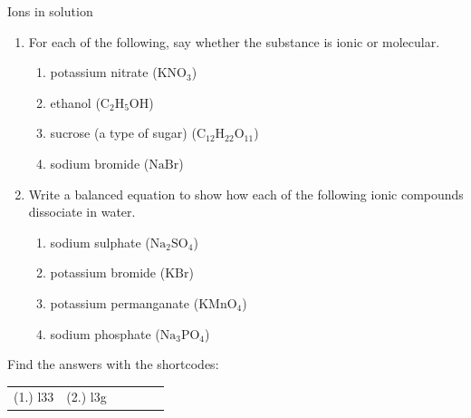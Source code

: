     \noindent
  \label{m38720*secfhsst!!!underscore!!!id338}
            \begin{exercises}{Ions in solution         }
            \nopagebreak
            \label{m38720*id336094}\begin{enumerate}[noitemsep, label=\textbf{\arabic*}. ] 
            \label{m38720*uid22}\item For each of the following, say whether the substance is ionic or molecular.
\label{m38720*id336110}\begin{enumerate}[noitemsep, label=\textbf{\alph*}. ] 
            \label{m38720*uid23}\item potassium nitrate ($\mathrm{KNO}{}_{3}$)
\label{m38720*uid24}\item ethanol ($\mathrm{C}{}_{2}\mathrm{H}{}_{5}\mathrm{OH}$)
\label{m38720*uid25}\item sucrose (a type of sugar) ($\mathrm{C}{}_{12}\mathrm{H}{}_{22}\mathrm{O}{}_{11}$)\label{m38720*uid26}\item sodium bromide ($\mathrm{NaBr}$)
\end{enumerate}
\label{m38720*uid27}\item Write a balanced equation to show how each of the following ionic compounds dissociate in water.
\label{m38720*id336252}\begin{enumerate}[noitemsep, label=\textbf{\alph*}. ] 
            \label{m38720*uid28}\item sodium sulphate ($\mathrm{Na}{}_{2}\mathrm{SO}{}_{4}$)
\label{m38720*uid29}\item potassium bromide ($\mathrm{KBr}$)
\label{m38720*uid30}\item potassium permanganate ($\mathrm{KMnO}{}_{4}$)
\label{m38720*uid31}\item sodium phosphate ($\mathrm{Na}{}_{3}\mathrm{PO}{}_{4}$)
\end{enumerate}
\end{enumerate}
      \label{m38720*uid32}
\par {} Find the answers with the shortcodes:
 \par \begin{tabular}[h]{cccccc}
 (1.) l33  &  (2.) l3g  & \end{tabular}
\end{exercises}
